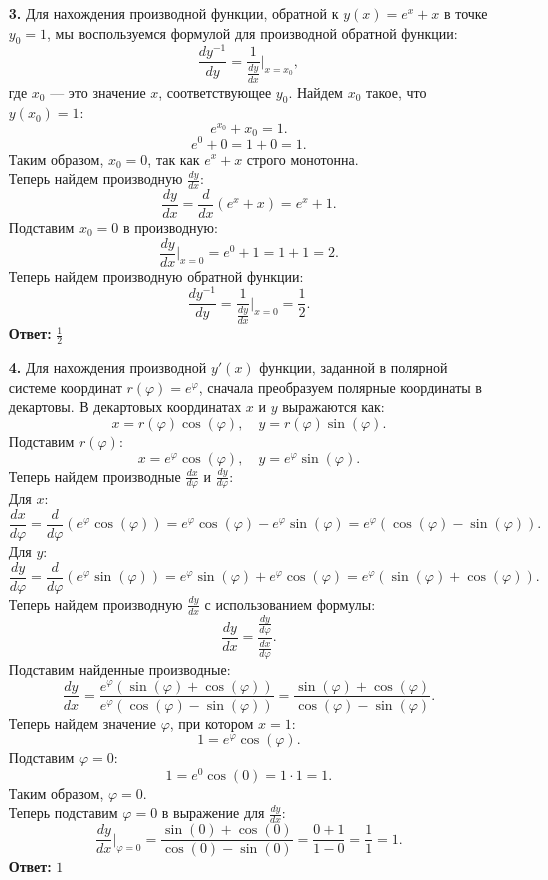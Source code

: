 \documentclass[a4paper]{article}
\renewcommand{\f}[2]{\frac{#1}{#2}}
\begin{document}
\begin{enumerate}
    \item[\textbf{3.}]Для нахождения производной функции, обратной к $ y(x) = e^{x} + x $ в точке $ y_0 = 1 $, мы воспользуемся формулой для производной обратной функции:
    $$
    \frac{dy^{-1}}{dy} = \frac{1}{\frac{dy}{dx}} \bigg|_{x = x_0},
    $$
    где $ x_0 $ — это значение $ x $, соответствующее $ y_0 $.
    Найдем $ x_0 $ такое, что $ y(x_0) = 1 $:
   $$
   e^{x_0} + x_0 = 1.
   $$
   $$
   e^{0} + 0 = 1 + 0 = 1.
   $$
   Таким образом, $ x_0 = 0 $, так как $e^x + x$ строго монотонна.\\
   Теперь найдем производную $ \frac{dy}{dx} $:
   $$
   \frac{dy}{dx} = \frac{d}{dx}(e^{x} + x) = e^{x} + 1.
   $$
   Подставим $ x_0 = 0 $ в производную:
   $$
   \frac{dy}{dx} \bigg|_{x=0} = e^{0} + 1 = 1 + 1 = 2.
   $$
   Теперь найдем производную обратной функции:
   $$
   \frac{dy^{-1}}{dy} = \frac{1}{\frac{dy}{dx}} \bigg|_{x=0} = \frac{1}{2}.
   $$
   \textbf{Ответ: } $\f{1}{2}$\\

   \item[\textbf{4.}]Для нахождения производной $ y'(x) $ функции, заданной в полярной системе координат $ r(\varphi) = e^{\varphi} $, сначала преобразуем полярные координаты в декартовы. В декартовых координатах $ x $ и $ y $ выражаются как:
    $$
    x = r(\varphi) \cos(\varphi), \quad y = r(\varphi) \sin(\varphi).
    $$
    Подставим $ r(\varphi) $:
    $$
    x = e^{\varphi} \cos(\varphi), \quad y = e^{\varphi} \sin(\varphi).
    $$
    Теперь найдем производные $ \frac{dx}{d\varphi} $ и $ \frac{dy}{d\varphi} $:\\
    Для $ x $:
    $$
    \frac{dx}{d\varphi} = \frac{d}{d\varphi}(e^{\varphi} \cos(\varphi)) = e^{\varphi} \cos(\varphi) - e^{\varphi} \sin(\varphi) = e^{\varphi} (\cos(\varphi) - \sin(\varphi)).
    $$
    Для $ y $:
    $$
    \frac{dy}{d\varphi} = \frac{d}{d\varphi}(e^{\varphi} \sin(\varphi)) = e^{\varphi} \sin(\varphi) + e^{\varphi} \cos(\varphi) = e^{\varphi} (\sin(\varphi) + \cos(\varphi)).
    $$
    Теперь найдем производную $ \frac{dy}{dx} $ с использованием формулы:
    $$
    \frac{dy}{dx} = \frac{\frac{dy}{d\varphi}}{\frac{dx}{d\varphi}}.
    $$
    Подставим найденные производные:
    $$
    \frac{dy}{dx} = \frac{e^{\varphi} (\sin(\varphi) + \cos(\varphi))}{e^{\varphi} (\cos(\varphi) - \sin(\varphi))} = \frac{\sin(\varphi) + \cos(\varphi)}{\cos(\varphi) - \sin(\varphi)}.
    $$
    Теперь найдем значение $ \varphi $, при котором $ x = 1 $:
    $$
    1 = e^{\varphi} \cos(\varphi).
    $$
    Подставим $ \varphi = 0 $:
    $$
    1 = e^{0} \cos(0) = 1 \cdot 1 = 1.
    $$
    Таким образом, $ \varphi = 0 $.\\
    Теперь подставим $ \varphi = 0 $ в выражение для $ \frac{dy}{dx} $:
    $$
    \frac{dy}{dx} \bigg|_{\varphi=0} = \frac{\sin(0) + \cos(0)}{\cos(0) - \sin(0)} = \frac{0 + 1}{1 - 0} = \frac{1}{1} = 1.
    $$
    \textbf{Ответ: } $1$


\end{enumerate}
\end{document}
